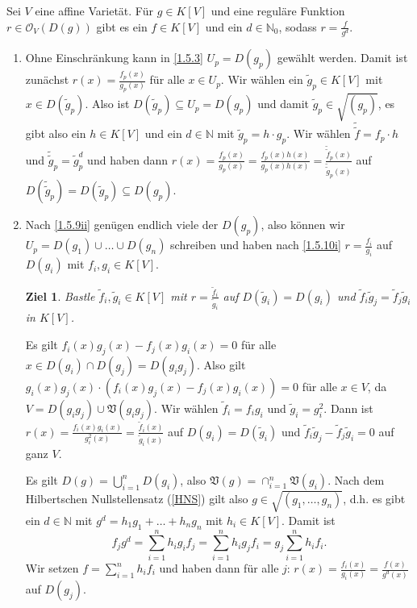 \documentclass[a4paper,12pt]{scrbook}
\makeatletter
\theoremstyle{blah}
\newtheorem*{ziel}{Ziel}
\theoremstyle{stz}
\renewcommand{\proofname}{Beweis}
\renewenvironment{proof}[1][\proofname]{\par
  \pushQED{\qed}%
  \normalfont \topsep6\p@\@plus6\p@\relax
  \trivlist
  \item[\hskip\labelsep
        \itshape
    #1\@addpunct{:}]\ignorespaces
}{%
  \popQED\endtrivlist\@endpefalse
}
\def\V{\mathfrak{V}}
\def\O{\mathcal{O}}
\newcommand{\set}[1]{\ensuremath{\mathbb{#1}}}
\newcommand{\N}{\set{N}}
\makeatother
\begin{document}
\begin{prop}\label{1.5.10}
  Sei $V$ eine affine Varietät. Für $g\in K[V]$ und eine reguläre Funktion $r\in\O_V(D(g))$ gibt es ein $f\in K[V]$ und ein
  $d\in\N_0$, sodass $r=\frac{f}{g^d}$.
\end{prop}
\begin{proof}
  \begin{enumerate}
  \item\label{1.5.10i} Ohne Einschränkung kann in \autoref{1.5.3} $U_p=D(g_p)$ gewählt werden. Damit ist zunächst
    $r(x)=\frac{f_p(x)}{g_p(x)}$ für alle $x\in U_p$. Wir wählen ein $\tilde{g}_p\in K[V]$ mit $x\in D(\tilde{g}_p)$. Also ist
    $D(\tilde{g}_p)\subseteq U_p=D(g_p)$ und damit $\tilde{g}_p\in\sqrt{(g_p)}$, es gibt also ein $h\in K[V]$ und ein $d\in\N$
    mit $\tilde{g}_p=h\cdot g_p$. Wir wählen $\tilde{\tilde{f}}=f_p\cdot h$ und $\tilde{\tilde{g}}_p=\tilde{g}_p^d$ und haben
    dann $r(x)=\frac{f_p(x)}{g_p(x)} = \frac{f_p(x)h(x)}{g_p(x)h(x)} = \frac{\tilde{\tilde{f}}_p(x)}{\tilde{\tilde{g}}_p(x)}$
    auf $D(\tilde{\tilde{g}}_p)=D(\tilde{g}_p)\subseteq D(g_p)$.
  \item Nach \autoref{1.5.9ii} genügen endlich viele der $D(g_p)$, also können wir $U_p=D(g_1)\cup\dotso\cup
    D(g_n)$ schreiben und haben nach \ref{1.5.10i} $r=\frac{f_i}{g_i}$ auf $D(g_i)$ mit $f_i,g_i\in K[V]$.
    \begin{ziel}
      Bastle $\tilde{f}_i,\tilde{g}_i\in K[V]$ mit $r=\frac{\tilde{f}_i}{\tilde{g}_i}$ auf $D(\tilde{g}_i)=D(g_i)$ und
      $\tilde{f}_i\tilde{g}_j=\tilde{f}_j\tilde{g}_i$ in $K[V]$.
    \end{ziel}
    Es gilt $f_i(x)g_j(x)-f_j(x)g_i(x)=0$ für alle $x\in D(g_i)\cap D(g_j)=D(g_ig_j)$. Also gilt
    $g_i(x)g_j(x)\cdot(f_i(x)g_j(x)-f_j(x)g_i(x))=0$ für alle $x\in V$, da $V=D(g_ig_j)\cup\V(g_ig_j)$. Wir wählen
    $\tilde{f}_i=f_ig_i$ und $\tilde{g}_i=g_i^2$. Dann ist $r(x)=\frac{f_i(x)g_i(x)}{g_i^2(x)} =
    \frac{\tilde{f}_i(x)}{\tilde{g}_i(x)}$ auf $D(g_i)=D(\tilde{g}_i)$ und $\tilde{f}_i\tilde{g}_j-\tilde{f}_j\tilde{g}_i=0$ auf
    ganz $V$.

    Es gilt $D(g)=\bigcup_{i=1}^n D(g_i)$, also $\V(g)=\cap_{i=1}^n\V(g_i)$. Nach dem Hilbertschen Nullstellensatz
    (\autoref{HNS}) gilt also $g\in\sqrt{(g_1,\dotsc,g_n)}$, d.h. es gibt ein $d\in\N$ mit $g^d=h_1g_1+\dotso+h_ng_n$ mit
    $h_i\in K[V]$. Damit ist
    \[ f_jg^d = \sum_{i=1}^nh_ig_if_j = \sum_{i=1}^n h_ig_jf_i = g_j\sum_{i=1}^nh_if_i. \]
    Wir setzen $f=\displaystyle\sum_{i=1}^nh_if_i$ und haben dann für alle $j$: $r(x)=\frac{f_i(x)}{g_i(x)}=\frac{f(x)}{g^d(x)}$
    auf $D(g_j)$.
  \end{enumerate}
\end{proof}
\end{document}
